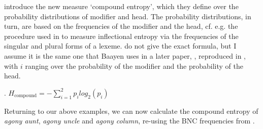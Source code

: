  \citet{PhamandBaayen:2013} introduce the new measure `compound entropy', which they
define over the probability distributions of modifier and head. 
The probability distributions, in turn, are based on the frequencies
of the modifier and the head, cf. e.g. the procedure used in
\citet{Baayenetal:2008b} to measure inflectional entropy via the
frequencies of the singular and plural forms of a lexeme. \citet{PhamandBaayen:2013} do not
give the exact formula, but I assume it is the same one that
Baayen uses in a later paper, \citet[468]{Baayenetal:2011}, reproduced
in \Next, with $i$ ranging over the probability of
the modifier and the probability of the head. %

\ex. \( \displaystyle H_{\text{compound}} = -\sum_{i=1}^2 p_i log_2 (p_i) \)

Returning to our above examples, we can now calculate the compound
entropy of \emph{agony aunt}, \emph{agony uncle} and \emph{agony
  column}, re-using the BNC frequencies from \LLast.

